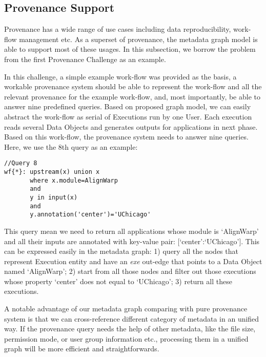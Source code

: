 \subsection{Provenance Support}
Provenance has a wide range of use cases including data reproducibility, work-flow management etc. As a superset of provenance, the metadata graph model is able to support most of these usages. In this subsection, we borrow the problem from the first Provenance Challenge as an example. 

In this challenge, a simple example work-flow was provided as the basis, a workable provenance system should be able to represent the work-flow and all the relevant provenance for the example work-flow, and, most importantly, be able to answer nine predefined queries. Based on proposed graph model, we can easily abstract the work-flow as serial of Executions run by one User. Each execution reads several Data Objects and generates outputs for applications in next phase. Based on this work-flow, the provenance system needs to answer nine queries. Here, we use the 8th query as an example:

\begin{lstlisting}
//Query 8
wf{*}: upstream(x) union x
       where x.module=AlignWarp
       and
       y in input(x)
       and
       y.annotation('center')='UChicago'
\end{lstlisting}

This query mean we need to return all applications whose module is `AlignWarp' and all their inputs are annotated with key-value pair: [`center':`UChicago']. This can be expressed easily in the metadata graph: 1) query all the nodes that represent Execution entity and have an \textit{exe} out-edge that points to a Data Object named `AlignWarp'; 2) start from all those nodes and filter out those executions whose property `center' does not equal to `UChicago'; 3) return all these executions.

A notable advantage of our metadata graph comparing with pure provenance system is that we can cross-reference different category of metadata in an unified way. If the provenance query needs the help of other metadata, like the file size, permission mode, or user group information etc., processing them in a unified graph will be more efficient and straightforwards.